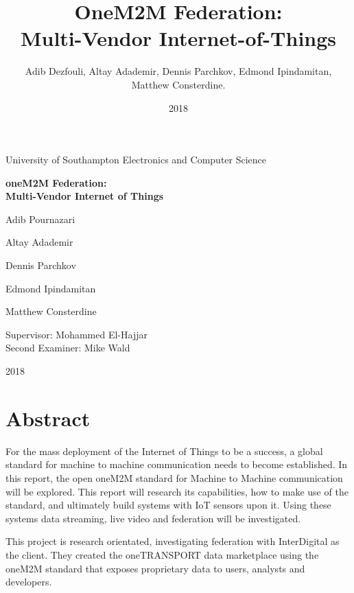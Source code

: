 \documentclass{ecsgdp}
\title{OneM2M Federation:\\ Multi-Vendor Internet-of-Things}
\date{2018}
\author{Adib Dezfouli, Altay Adademir, Dennis Parchkov, Edmond Ipindamitan, Matthew Consterdine.}
\newcommand\blankpage{%
    \null
    \thispagestyle{empty}%
    \addtocounter{page}{-1}%
    \newpage}
\def\wl{\par \vspace{\baselineskip}}
\begin{document}
  \begin{titlepage}
    \hspace{0pt}
    \vfill
    \centering
    
    \Huge University of Southampton
    \Huge Electronics and Computer Science

    \hfill\wl

    \huge \textbf{oneM2M Federation:\\Multi-Vendor Internet of Things}

    \hfill\wl

    \large Adib Pournazari

    \large Altay Adademir

    \large Dennis Parchkov

    \large Edmond Ipindamitan

    \large Matthew Consterdine

    \hfill\wl

    \LARGE Supervisor: Mohammed El-Hajjar\\
    \LARGE Second Examiner: Mike Wald

    \hfill\wl

    \LARGE 2018
    
    \vfill
    \hspace{0pt}
  \end{titlepage}
  
  \afterpage{\blankpage}
  \clearpage
  

  \chapter*{Abstract}
  \label{sec:abstract}

  For the mass deployment of the Internet of Things to be a success, a global standard for machine to machine communication needs to become established. In this report, the open oneM2M standard for Machine to Machine communication will be explored. This report will research its capabilities, how to make use of the standard, and ultimately build systems with IoT sensors upon it. Using these systems data streaming, live video and federation will be investigated.

   This project is research orientated, investigating federation with InterDigital as the client. They created the oneTRANSPORT data marketplace using the oneM2M standard that exposes proprietary data to users, analysts and developers.
\end{document}
